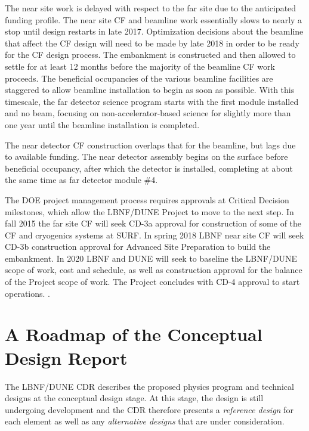 The near site work is delayed with respect to the far site due to the anticipated funding profile. The near site CF and beamline work essentially slows to nearly a stop %
until design restarts in late 2017. Optimization decisions about the beamline that affect the CF design will need to be made by late 2018 in order to be ready for the CF design process. The embankment is constructed and then allowed to settle for at least 12 months before the majority of the beamline CF work proceeds. The beneficial occupancies of the various beamline facilities %
are staggered to allow beamline installation to begin as soon as possible. With this timescale, the far detector science program %
starts with the first module installed and no beam, focusing on non-accelerator-based science %
for slightly more than one year until 
the beamline installation is completed.


The near detector CF construction overlaps that for the beamline, but lags due to available funding. The near detector assembly begins on the surface before beneficial occupancy, after which the detector is installed, completing at about the same time as far detector module \#4. 

The DOE project management process requires approvals at Critical Decision milestones, which allow the LBNF/DUNE Project to move to the next step. In fall 2015 the far site CF will seek CD-3a approval for construction of some of the CF and cryogenics systems at SURF. In spring 2018 LBNF near site CF will seek CD-3b construction approval for Advanced Site Preparation to build the embankment. In 2020 LBNF and DUNE will seek to baseline the LBNF/DUNE scope of work, cost and schedule, as well as construction approval for the balance of the Project scope of work. %
The Project concludes with CD-4 approval to start operations.
. 


\section{A Roadmap of the Conceptual Design Report}

The LBNF/DUNE CDR describes the proposed physics program and 
technical designs at the conceptual design stage.  At this stage, the design is
still undergoing development and the CDR therefore presents a \textit{reference design} for each element as well as any 
\textit{alternative designs} that are under consideration.

